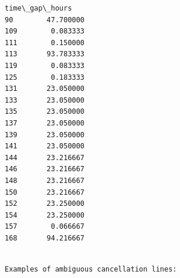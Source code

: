 \documentclass[11pt]{article}
\begin{document}
\begin{Verbatim}[commandchars=\\\{\}]
     time\_gap\_hours  
90        47.700000  
109        0.083333  
111        0.150000  
113       93.783333  
119        0.083333  
125        0.183333  
131       23.050000  
133       23.050000  
135       23.050000  
137       23.050000  
139       23.050000  
141       23.050000  
144       23.216667  
146       23.216667  
148       23.216667  
150       23.216667  
152       23.250000  
154       23.250000  
157        0.066667  
168       94.216667  
    \end{Verbatim}

    
    \begin{Verbatim}[commandchars=\\\{\}]

Examples of ambiguous cancellation lines:
    \end{Verbatim}
\end{document}
